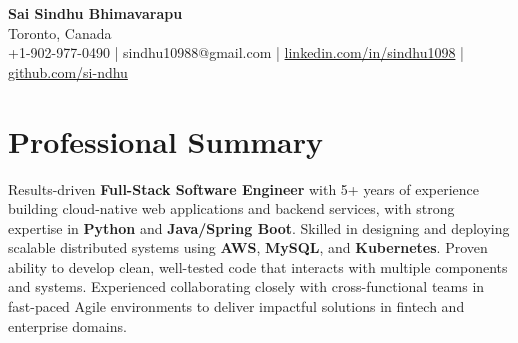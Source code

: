 \documentclass[letterpaper,11pt]{article}
\begin{document}
\begin{center}
  {\Large \textbf{Sai Sindhu Bhimavarapu}} \\
  Toronto, Canada \\
  +1-902-977-0490 \enspace | \enspace sindhu10988@gmail.com \enspace | \enspace \href{https://www.linkedin.com/in/sindhu1098/}{linkedin.com/in/sindhu1098} \enspace | \enspace \href{https://github.com/si-ndhu}{github.com/si-ndhu}
\end{center}

\section{Professional Summary}
  \begin{itemize}[leftmargin=0.15in, label={}]
    \small{\item{
     Results-driven \textbf{Full-Stack Software Engineer} with 5+ years of experience building cloud-native web applications and backend services, with strong expertise in \textbf{Python} and \textbf{Java/Spring Boot}. Skilled in designing and deploying scalable distributed systems using \textbf{AWS}, \textbf{MySQL}, and \textbf{Kubernetes}. Proven ability to develop clean, well-tested code that interacts with multiple components and systems. Experienced collaborating closely with cross-functional teams in fast-paced Agile environments to deliver impactful solutions in fintech and enterprise domains.
    }}
  \end{itemize}
\vspace{-16pt}

\end{document}
